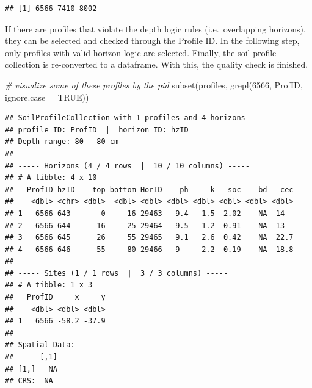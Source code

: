 \documentclass[
  10pt,
  b5paper,
  oneside]{book}
\newenvironment{Shaded}{\begin{snugshade}}{\end{snugshade}}
\newcommand{\AttributeTok}[1]{\textcolor[rgb]{0.77,0.63,0.00}{#1}}
\newcommand{\CommentTok}[1]{\textcolor[rgb]{0.56,0.35,0.01}{\textit{#1}}}
\newcommand{\ConstantTok}[1]{\textcolor[rgb]{0.00,0.00,0.00}{#1}}
\newcommand{\DecValTok}[1]{\textcolor[rgb]{0.00,0.00,0.81}{#1}}
\newcommand{\FunctionTok}[1]{\textcolor[rgb]{0.00,0.00,0.00}{#1}}
\newcommand{\NormalTok}[1]{#1}
\newcommand{\OtherTok}[1]{\textcolor[rgb]{0.56,0.35,0.01}{#1}}
\newcommand{\SpecialCharTok}[1]{\textcolor[rgb]{0.00,0.00,0.00}{#1}}
\newcommand{\StringTok}[1]{\textcolor[rgb]{0.31,0.60,0.02}{#1}}
\begin{document}
\begin{Shaded}
\end{Shaded}

\begin{verbatim}
## [1] 6566 7410 8002
\end{verbatim}

If there are profiles that violate the depth logic rules (i.e.~overlapping horizons), they can be selected and checked through the Profile ID. In the following step, only profiles with valid horizon logic are selected. Finally, the soil profile collection is re-converted to a dataframe. With this, the quality check is finished.

\begin{Shaded}
\begin{Highlighting}[]
\CommentTok{\# visualize some of these profiles by the pid}
\FunctionTok{subset}\NormalTok{(profiles, }\FunctionTok{grepl}\NormalTok{(}\DecValTok{6566}\NormalTok{, ProfID, }\AttributeTok{ignore.case =} \ConstantTok{TRUE}\NormalTok{))}
\end{Highlighting}
\end{Shaded}

\begin{verbatim}
## SoilProfileCollection with 1 profiles and 4 horizons
## profile ID: ProfID  |  horizon ID: hzID 
## Depth range: 80 - 80 cm
## 
## ----- Horizons (4 / 4 rows  |  10 / 10 columns) -----
## # A tibble: 4 x 10
##   ProfID hzID    top bottom HorID    ph     k   soc    bd   cec
##    <dbl> <chr> <dbl>  <dbl> <dbl> <dbl> <dbl> <dbl> <dbl> <dbl>
## 1   6566 643       0     16 29463   9.4   1.5  2.02    NA  14  
## 2   6566 644      16     25 29464   9.5   1.2  0.91    NA  13  
## 3   6566 645      26     55 29465   9.1   2.6  0.42    NA  22.7
## 4   6566 646      55     80 29466   9     2.2  0.19    NA  18.8
## 
## ----- Sites (1 / 1 rows  |  3 / 3 columns) -----
## # A tibble: 1 x 3
##   ProfID     x     y
##    <dbl> <dbl> <dbl>
## 1   6566 -58.2 -37.9
## 
## Spatial Data:
##      [,1]
## [1,]   NA
## CRS:  NA
\end{verbatim}
\end{document}
